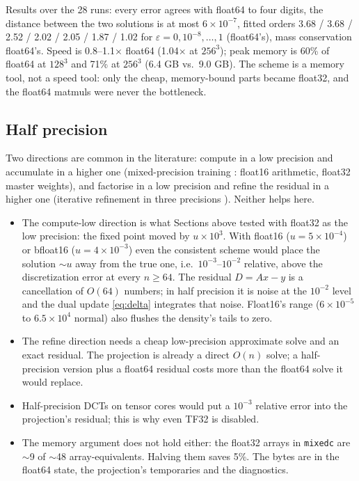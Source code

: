 \documentclass[11pt]{article}
\newcommand{\eps}{\varepsilon}
\newcommand{\code}[1]{\texttt{#1}}
\begin{document}
Results over the 28 runs: every error agrees with float64 to four digits, the distance
between the two solutions is at most $6\times10^{-7}$, fitted orders 3.68 / 3.68 / 2.52 /
2.02 / 2.05 / 1.87 / 1.02 for $\eps=0,10^{-8},\dots,1$ (float64's), mass conservation
float64's. Speed is 0.8--1.1$\times$ float64 (1.04$\times$ at $256^3$); peak memory is
60\% of float64 at $128^3$ and 71\% at $256^3$ (6.4 GB vs.\ 9.0 GB). The scheme is a
memory tool, not a speed tool: only the cheap, memory-bound parts became float32, and
the float64 matmuls were never the bottleneck.

\subsection{Half precision}\label{sec:half}

Two directions are common in the literature: compute in a low precision and accumulate
in a higher one (mixed-precision training \cite{micikevicius2018}: float16 arithmetic,
float32 master weights), and factorise in a low precision and refine the residual in a
higher one (iterative refinement in three precisions \cite{carson2018,higham2022}).
Neither helps here.
\begin{itemize}
  \item The compute-low direction is what Sections above tested with float32 as the low
  precision: the fixed point moved by $u\times10^3$. With float16 ($u=5\times10^{-4}$) or
  bfloat16 ($u=4\times10^{-3}$) even the consistent scheme would place the solution
  $\sim u$ away from the true one, i.e.\ $10^{-3}$--$10^{-2}$ relative, above the
  discretization error at every $n\ge 64$. The residual $D = Ax - y$ is a cancellation
  of $O(64)$ numbers; in half precision it is noise at the $10^{-2}$ level and the dual
  update \eqref{eq:delta} integrates that noise. Float16's range ($6\times10^{-5}$ to
  $6.5\times10^4$ normal) also flushes the density's tails to zero.
  \item The refine direction needs a cheap low-precision approximate solve and an exact
  residual. The projection is already a direct $O(n)$ solve; a half-precision version
  plus a float64 residual costs more than the float64 solve it would replace.
  \item Half-precision DCTs on tensor cores would put a $10^{-3}$ relative error into the
  projection's residual; this is why even TF32 is disabled.
  \item The memory argument does not hold either: the float32 arrays in \code{mixedc}
  are $\sim$9 of $\sim$48 array-equivalents. Halving them saves 5\%. The bytes are in
  the float64 state, the projection's temporaries and the diagnostics.
\end{itemize}
\end{document}

